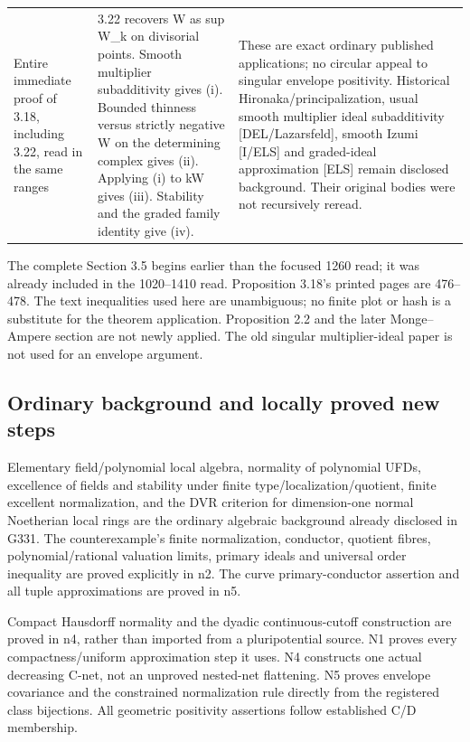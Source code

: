 \documentclass[11pt]{article}
\begin{document}
\begin{longtable}{p{4.47cm}p{4.47cm}p{4.47cm}}
Entire immediate proof of 3.18, including 3.22, read in the same ranges & 3.22 recovers W as sup W\_k on divisorial points. Smooth multiplier subadditivity gives (i). Bounded thinness versus strictly negative W on the determining complex gives (ii). Applying (i) to kW gives (iii). Stability and the graded family identity give (iv). & These are exact ordinary published applications; no circular appeal to singular envelope positivity. Historical Hironaka/principalization, usual smooth multiplier ideal subadditivity [DEL/Lazarsfeld], smooth Izumi [I/ELS] and graded-ideal approximation [ELS] remain disclosed background. Their original bodies were not recursively reread. \\
\end{longtable}\normalsize

The complete Section 3.5 begins earlier than the focused 1260 read; it was already included in the 1020--1410 read. Proposition 3.18's printed pages are 476--478. The text inequalities used here are unambiguous; no finite plot or hash is a substitute for the theorem application. Proposition 2.2 and the later Monge--Ampere section are not newly applied. The old singular multiplier-ideal paper is not used for an envelope argument.

\subsection{Ordinary background and locally proved new steps}

Elementary field/polynomial local algebra, normality of polynomial UFDs, excellence of fields and stability under finite type/localization/quotient, finite excellent normalization, and the DVR criterion for dimension-one normal Noetherian local rings are the ordinary algebraic background already disclosed in G331. The counterexample's finite normalization, conductor, quotient fibres, polynomial/rational valuation limits, primary ideals and universal order inequality are proved explicitly in n2. The curve primary-conductor assertion and all tuple approximations are proved in n5.

Compact Hausdorff normality and the dyadic continuous-cutoff construction are proved in n4, rather than imported from a pluripotential source. N1 proves every compactness/uniform approximation step it uses. N4 constructs one actual decreasing C-net, not an unproved nested-net flattening. N5 proves envelope covariance and the constrained normalization rule directly from the registered class bijections. All geometric positivity assertions follow established C/D membership.
\end{document}
